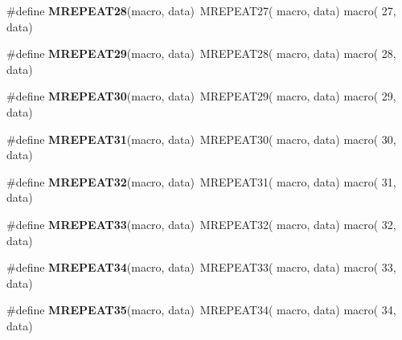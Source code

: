 \begin{DoxyCompactItemize}
\item 
\hypertarget{group__group__sam0__utils__mrepeat_gab45193969a834715c8a19fc7c2d4a173}{}\#define {\bfseries M\+R\+E\+P\+E\+A\+T28}(macro,  data)~M\+R\+E\+P\+E\+A\+T27( macro, data)   macro( 27, data)\label{group__group__sam0__utils__mrepeat_gab45193969a834715c8a19fc7c2d4a173}

\item 
\hypertarget{group__group__sam0__utils__mrepeat_ga45db5721fbef0548ff66d27c2d7c4393}{}\#define {\bfseries M\+R\+E\+P\+E\+A\+T29}(macro,  data)~M\+R\+E\+P\+E\+A\+T28( macro, data)   macro( 28, data)\label{group__group__sam0__utils__mrepeat_ga45db5721fbef0548ff66d27c2d7c4393}

\item 
\hypertarget{group__group__sam0__utils__mrepeat_ga7b2a77fc380778a167d44b347ac338a8}{}\#define {\bfseries M\+R\+E\+P\+E\+A\+T30}(macro,  data)~M\+R\+E\+P\+E\+A\+T29( macro, data)   macro( 29, data)\label{group__group__sam0__utils__mrepeat_ga7b2a77fc380778a167d44b347ac338a8}

\item 
\hypertarget{group__group__sam0__utils__mrepeat_ga8716e59c066fbf28d4a05a2df9ce1e7e}{}\#define {\bfseries M\+R\+E\+P\+E\+A\+T31}(macro,  data)~M\+R\+E\+P\+E\+A\+T30( macro, data)   macro( 30, data)\label{group__group__sam0__utils__mrepeat_ga8716e59c066fbf28d4a05a2df9ce1e7e}

\item 
\hypertarget{group__group__sam0__utils__mrepeat_ga36c6234214aab94448eb8c65ecdc2f08}{}\#define {\bfseries M\+R\+E\+P\+E\+A\+T32}(macro,  data)~M\+R\+E\+P\+E\+A\+T31( macro, data)   macro( 31, data)\label{group__group__sam0__utils__mrepeat_ga36c6234214aab94448eb8c65ecdc2f08}

\item 
\hypertarget{group__group__sam0__utils__mrepeat_ga36d12737d2ee8e77fbdef2f18c697164}{}\#define {\bfseries M\+R\+E\+P\+E\+A\+T33}(macro,  data)~M\+R\+E\+P\+E\+A\+T32( macro, data)   macro( 32, data)\label{group__group__sam0__utils__mrepeat_ga36d12737d2ee8e77fbdef2f18c697164}

\item 
\hypertarget{group__group__sam0__utils__mrepeat_gad9540e7ec7a97aade78bdbfb0fbc1649}{}\#define {\bfseries M\+R\+E\+P\+E\+A\+T34}(macro,  data)~M\+R\+E\+P\+E\+A\+T33( macro, data)   macro( 33, data)\label{group__group__sam0__utils__mrepeat_gad9540e7ec7a97aade78bdbfb0fbc1649}

\item 
\hypertarget{group__group__sam0__utils__mrepeat_ga20ad71ff8aba1011aa0cb4cf86669f73}{}\#define {\bfseries M\+R\+E\+P\+E\+A\+T35}(macro,  data)~M\+R\+E\+P\+E\+A\+T34( macro, data)   macro( 34, data)\label{group__group__sam0__utils__mrepeat_ga20ad71ff8aba1011aa0cb4cf86669f73}


\end{DoxyCompactItemize}
